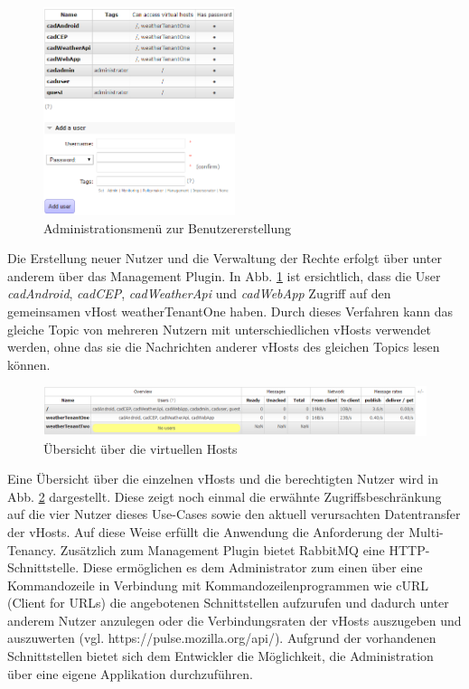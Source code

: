 \documentclass[paper,oneside,onecolumn,notitlepage,bibtotocnumbered,fontsize=12pt,bigheadings,ngerman]{scrartcl}
\begin{document}
\begin{figure}[htbp]
	\centering
	\includegraphics[width=0.5\textwidth]{Bilder/createUser.png}
	\caption{Administrationsmenü zur Benutzererstellung }
	\label{img:AdminCreateUser}
\end{figure}
Die Erstellung neuer Nutzer und die Verwaltung der Rechte erfolgt über unter anderem über das Management Plugin. In Abb. \ref{img:AdminCreateUser} ist ersichtlich, dass die User \textit{cadAndroid}, \textit{cadCEP}, \textit{cadWeatherApi} und \textit{cadWebApp} Zugriff auf den gemeinsamen vHost weatherTenantOne haben. Durch dieses Verfahren kann das gleiche Topic von mehreren Nutzern mit unterschiedlichen vHosts verwendet werden, ohne das sie die Nachrichten anderer vHosts des gleichen Topics lesen können. 
\begin{figure}[htbp]
	\centering
	\includegraphics[width=1.0\textwidth]{Bilder/vHostsOverview.png}
	\caption{Übersicht über die virtuellen Hosts}
	\label{img:vHostOverview}
\end{figure}
Eine Übersicht über die einzelnen vHosts und die berechtigten Nutzer wird in Abb. \ref{img:vHostOverview} dargestellt. Diese zeigt noch einmal die erwähnte Zugriffsbeschränkung auf die vier Nutzer dieses Use-Cases sowie den aktuell verursachten Datentransfer der vHosts. Auf diese Weise erfüllt die Anwendung die Anforderung der Multi-Tenancy. Zusätzlich zum Management Plugin bietet RabbitMQ eine HTTP-Schnittstelle. Diese ermöglichen es dem Administrator zum einen über eine Kommandozeile in Verbindung mit Kommandozeilenprogrammen wie cURL (Client for URLs) die angebotenen Schnittstellen aufzurufen und dadurch unter anderem Nutzer anzulegen oder die Verbindungsraten der vHosts auszugeben und auszuwerten (vgl. https://pulse.mozilla.org/api/). Aufgrund der vorhandenen Schnittstellen bietet sich dem Entwickler die Möglichkeit, die Administration über eine eigene Applikation durchzuführen. 
\end{document}
